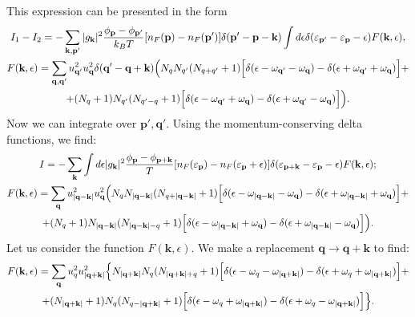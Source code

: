 This expression can be presented in the form
%
\begin{gather}\label{6}
I_1-I_2=-\sum_{\mathbf{k},\mathbf{p}'}|g_\textbf{k}|^2\frac{\phi_{\mathbf{p}}-\phi_{\mathbf{p^\prime}}}{k_BT}
[n_F(\mathbf{p})-n_F(\mathbf{p}^\prime)]
\delta(\textbf{p}'-\textbf{p}-\textbf{k})\int d \epsilon \delta(\varepsilon_{\textbf{p}'}-\varepsilon_{\textbf{p}}-\epsilon)F(\textbf{k},\epsilon),\\\nonumber
F(\textbf{k},\epsilon)=\sum_{\mathbf{q},\mathbf{q}'} u^2_{\textbf{q}'}u^2_{\textbf{q}}
\delta(\textbf{q}'-\textbf{q}+\textbf{k})
\Bigl(
N_{q}N_{q^\prime}(N_{q+q^\prime}+1)
\Bigl[\delta(\epsilon-\omega_{\textbf{q}'}-\omega_{\textbf{q}})
-
\delta(\epsilon+\omega_{\textbf{q}'}+\omega_{\textbf{q}})\Bigl]+\\
\nonumber
+
(N_{q}+1)N_{q^\prime}(N_{q^\prime-q}+1)
\Bigr[\delta(\epsilon-\omega_{\textbf{q}'}+\omega_{\textbf{q}})
-
\delta(\epsilon+\omega_{\textbf{q}'}-\omega_{\textbf{q}})\Bigr]
\Bigr).
\end{gather}
%
Now we can integrate over $\textbf{p}',\textbf{q}'$. Using the momentum-conserving delta functions, we find:
%
\begin{gather}\label{7}
I=-\sum_{\mathbf{k}}\int d \epsilon |g_\textbf{k}|^2\frac{\phi_{\mathbf{p}}-\phi_{\textbf{p}+\textbf{k}}}{T}
[n_F(\varepsilon_{\textbf{p}})-n_F(\varepsilon_{\textbf{p}}+\epsilon)]
 \delta(\varepsilon_{\textbf{p}+\textbf{k}}-\varepsilon_{\textbf{p}}-\epsilon)F(\textbf{k},\epsilon);\\\nonumber
F(\textbf{k},\epsilon)=\sum_{\mathbf{q}} u^2_{|\textbf{q}-\textbf{k}|}u^2_{\textbf{q}}
\Bigl(
N_{q}N_{|\textbf{q}-\textbf{k}|}(N_{q+|\textbf{q}-\textbf{k}|}+1)
\Bigl[\delta(\epsilon-\omega_{|\textbf{q}-\textbf{k}|}-\omega_{\textbf{q}})
-
\delta(\epsilon+\omega_{|\textbf{q}-\textbf{k}|}+\omega_{\textbf{q}})\Bigl]+\\
\nonumber
+
(N_{q}+1)N_{|\textbf{q}-\textbf{k}|}(N_{|\textbf{q}-\textbf{k}|-q}+1)
\Bigr[\delta(\epsilon-\omega_{|\textbf{q}-\textbf{k}|}+\omega_{\textbf{q}})
-
\delta(\epsilon+\omega_{|\textbf{q}-\textbf{k}|}-\omega_{\textbf{q}})\Bigr]
\Bigr).
\end{gather}
%
Let us consider the function $F(\mathbf{k},\epsilon)$. We make a replacement $\mathbf{q}\rightarrow \mathbf{q}+\mathbf{k}$ to find:
%
\begin{gather}
F(\textbf{k},\epsilon)=\sum_{\mathbf{q}} u^2_{q}u^2_{|\textbf{q}+\textbf{k}|}
\Bigl\{
N_{|\textbf{q}+\textbf{k}|}N_{q}(N_{|\textbf{q}+\textbf{k}|+q}+1)
\Bigl[\delta(\epsilon-\omega_{q}-\omega_{|\textbf{q}+\textbf{k}|})
-
\delta(\epsilon+\omega_{q}+\omega_{|\textbf{q}+\textbf{k}|})\Bigl]+\\
\nonumber
+
(N_{|\textbf{q}+\textbf{k}|}+1)N_{q}(N_{q-|\textbf{q}+\textbf{k}|}+1)
\Bigr[\delta(\epsilon-\omega_{q}+\omega_{|\textbf{q}+\textbf{k}|})
-
\delta(\epsilon+\omega_{q}-\omega_{|\textbf{q}+\textbf{k}|})\Bigr]
\Bigr\}.
\end{gather}
